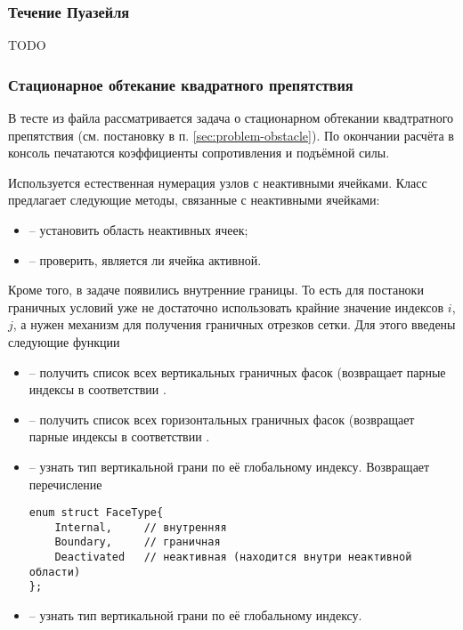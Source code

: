 \subsubsection{Течение Пуазейля}
TODO

\subsubsection{Стационарное обтекание квадратного препятствия}

В тесте  из файла 
рассматривается задача о стационарном обтекании
квадтратного препятствия (см. постановку в п. \ref{sec:problem-obstacle}).
По окончании расчёта в консоль печатаются коэффициенты сопротивления и подъёмной силы.

Используется естественная нумерация узлов с неактивными ячейками.
Класс  предлагает следующие методы, связанные с неактивными ячейками:
\begin{itemize}
\item
{} -- установить область неактивных ячеек;
\item
{} -- проверить, является ли ячейка активной.
\end{itemize}

Кроме того, в задаче появились внутренние границы.
То есть для постаноки граничных условий уже не достаточно
использовать крайние значение индексов $i$, $j$,
а нужен механизм для получения граничных отрезков сетки.
Для этого введены следующие функции
\begin{itemize}
\item
{} -- получить список всех вертикальных граничных фасок (возвращает парные индексы в
соответствии .
\item
{}  -- получить список всех горизонтальных граничных фасок (возвращает парные индексы в
соответствии .
\item
{} -- узнать тип вертикальной грани по её глобальному индексу.
Возвращает перечисление
\begin{verbatim}
enum struct FaceType{
	Internal,     // внутренняя
	Boundary,     // граничная
	Deactivated   // неактивная (находится внутри неактивной области)
};
\end{verbatim}
\item
{} -- узнать тип вертикальной грани по её глобальному индексу.
\end{itemize}

